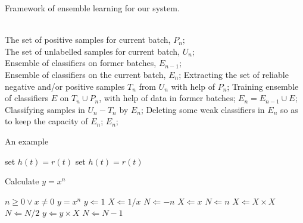 \documentclass[12pt]{article}
\begin{document}
\clearpage
\begin{algorithm}[htb]
    \caption{ Framework of ensemble learning for our system.}
    \label{alg:Framwork}
    \begin{algorithmic}[1] %
    \REQUIRE ~~\\ %
        The set of positive samples for current batch, $P_n$;\\
        The set of unlabelled samples for current batch, $U_n$;\\
        Ensemble of classifiers on former batches, $E_{n-1}$;
    \ENSURE ~~\\ %
        Ensemble of classifiers on the current batch, $E_n$;
        \STATE Extracting the set of reliable negative and/or positive samples $T_n$ from $U_n$ with help of $P_n$;
        \STATE Training ensemble of classifiers $E$ on $T_n \cup P_n$, with help of data in former batches;
        \STATE $E_n=E_{n-1}\cup E$;
        \STATE Classifying samples in $U_n-T_n$ by $E_n$;
        \STATE Deleting some weak classifiers in $E_n$ so as to keep the capacity of $E_n$;
    \RETURN $E_n$; %
    \end{algorithmic}
\end{algorithm}
\begin{algorithm}
    \caption{An example}
    \label{alg:2}
    \begin{algorithmic}
        \REPEAT
        \STATE set $h(t)=r(t)$
        \REPEAT
        \STATE set $h(t)=r(t)$
    \end{algorithmic}
\end{algorithm}
\begin{algorithm}
    \caption{Calculate $y = x^n$}
    \label{alg:3}
    \begin{algorithmic}
        \REQUIRE $n \geq 0 \vee x \neq 0$
        \ENSURE $y = x^n$
        \STATE $y \Leftarrow 1$
        \STATE $X \Leftarrow 1 / x$
        \STATE $N \Leftarrow -n$
    \ELSE
        \STATE $X \Leftarrow x$
        \STATE $N \Leftarrow n$
    \ENDIF
            \STATE $X \Leftarrow X \times X$
            \STATE $N \Leftarrow N / 2$
        \ELSE[$N$ is odd]
            \STATE $y \Leftarrow y \times X$
            \STATE $N \Leftarrow N - 1$
        \ENDIF
    \ENDWHILE
    \end{algorithmic}
\end{algorithm}
\end{document}
